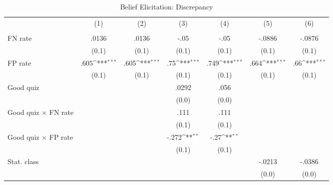 \begin{table}[htbp]\centering
\def\sym#1{\ifmmode^{#1}\else\(^{#1}\)\fi}
\caption{Belief Elicitation: Discrepancy}
\begin{tabular}{l*{6}{c}}
\hline\hline
                &\multicolumn{1}{c}{(1)}&\multicolumn{1}{c}{(2)}&\multicolumn{1}{c}{(3)}&\multicolumn{1}{c}{(4)}&\multicolumn{1}{c}{(5)}&\multicolumn{1}{c}{(6)}\\
                &\multicolumn{1}{c}{}&\multicolumn{1}{c}{}&\multicolumn{1}{c}{}&\multicolumn{1}{c}{}&\multicolumn{1}{c}{}&\multicolumn{1}{c}{}\\
\hline
FN rate         &    .0136         &    .0136         &     -.05         &     -.05         &   -.0886         &   -.0876         \\
                &    (0.1)         &    (0.1)         &    (0.1)         &    (0.1)         &    (0.1)         &    (0.1)         \\
FP rate         &     .605\sym{***}&     .605\sym{***}&      .75\sym{***}&     .749\sym{***}&     .664\sym{***}&      .66\sym{***}\\
                &    (0.1)         &    (0.1)         &    (0.1)         &    (0.1)         &    (0.1)         &    (0.1)         \\
Good quiz       &                  &                  &    .0292         &     .056         &                  &                  \\
                &                  &                  &    (0.0)         &    (0.0)         &                  &                  \\
Good quiz $\times$ FN rate&                  &                  &     .111         &     .111         &                  &                  \\
                &                  &                  &    (0.1)         &    (0.1)         &                  &                  \\
Good quiz $\times$ FP rate&                  &                  &    -.272\sym{**} &     -.27\sym{**} &                  &                  \\
                &                  &                  &    (0.1)         &    (0.1)         &                  &                  \\
Stat. class     &                  &                  &                  &                  &   -.0213         &   -.0386         \\
                &                  &                  &                  &                  &    (0.0)         &    (0.0)         \\

\end{tabular}
\end{table}
